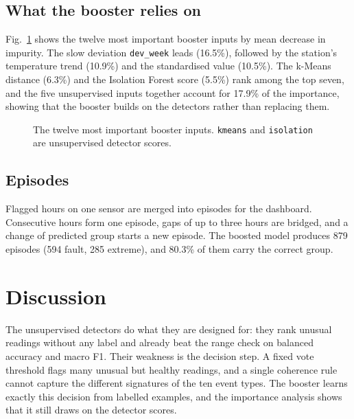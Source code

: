 \documentclass[conference]{IEEEtran}
\begin{document}
\subsection{What the booster relies on}
Fig.~\ref{fig:importance} shows the twelve most important booster inputs by mean decrease in
impurity. The slow deviation \texttt{dev\_week} leads (16.5\%), followed by the station's
temperature trend (10.9\%) and the standardised value (10.5\%). The k-Means distance (6.3\%) and the
Isolation Forest score (5.5\%) rank among the top seven, and the five unsupervised inputs together
account for 17.9\% of the importance, showing that the booster builds on the detectors rather than
replacing them.

\begin{figure}[t]
\centering
{}
\caption{The twelve most important booster inputs. \texttt{kmeans} and \texttt{isolation} are
unsupervised detector scores.}
\label{fig:importance}
\end{figure}

\subsection{Episodes}
Flagged hours on one sensor are merged into episodes for the dashboard. Consecutive hours form one
episode, gaps of up to three hours are bridged, and a change of predicted group starts a new episode.
The boosted model produces 879 episodes (594 fault, 285 extreme), and 80.3\% of them carry the correct group.

\section{Discussion}
The unsupervised detectors do what they are designed for: they rank unusual readings without any
label and already beat the range check on balanced accuracy and macro F1. Their weakness is the
decision step. A fixed vote threshold flags many unusual but healthy readings, and a single
coherence rule cannot capture the different signatures of the ten event types. The booster learns
exactly this decision from labelled examples, and the importance analysis shows that it still draws
on the detector scores.
\end{document}

